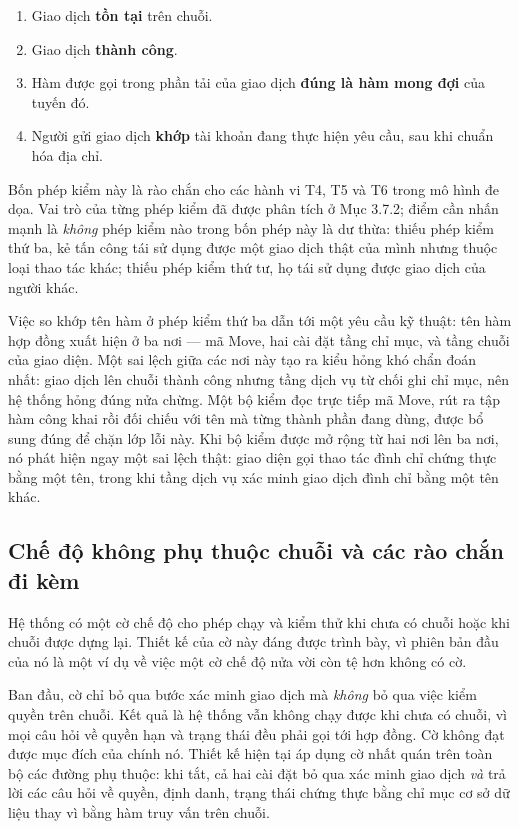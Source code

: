 \begin{enumerate}
    \item Giao dịch \textbf{tồn tại} trên chuỗi.
    \item Giao dịch \textbf{thành công}.
    \item Hàm được gọi trong phần tải của giao dịch \textbf{đúng là hàm mong đợi} của tuyến đó.
    \item Người gửi giao dịch \textbf{khớp} tài khoản đang thực hiện yêu cầu, sau khi chuẩn hóa địa chỉ.
\end{enumerate}

Bốn phép kiểm này là rào chắn cho các hành vi T4, T5 và T6 trong mô hình đe dọa. Vai trò của từng phép kiểm đã được phân tích ở Mục 3.7.2; điểm cần nhấn mạnh là \emph{không} phép kiểm nào trong bốn phép này là dư thừa: thiếu phép kiểm thứ ba, kẻ tấn công tái sử dụng được một giao dịch thật của mình nhưng thuộc loại thao tác khác; thiếu phép kiểm thứ tư, họ tái sử dụng được giao dịch của người khác.

Việc so khớp tên hàm ở phép kiểm thứ ba dẫn tới một yêu cầu kỹ thuật: tên hàm hợp đồng xuất hiện ở ba nơi --- mã Move, hai cài đặt tầng chỉ mục, và tầng chuỗi của giao diện. Một sai lệch giữa các nơi này tạo ra kiểu hỏng khó chẩn đoán nhất: giao dịch lên chuỗi thành công nhưng tầng dịch vụ từ chối ghi chỉ mục, nên hệ thống hỏng đúng nửa chừng. Một bộ kiểm đọc trực tiếp mã Move, rút ra tập hàm công khai rồi đối chiếu với tên mà từng thành phần đang dùng, được bổ sung đúng để chặn lớp lỗi này. Khi bộ kiểm được mở rộng từ hai nơi lên ba nơi, nó phát hiện ngay một sai lệch thật: giao diện gọi thao tác đình chỉ chứng thực bằng một tên, trong khi tầng dịch vụ xác minh giao dịch đình chỉ bằng một tên khác.

\subsection{Chế độ không phụ thuộc chuỗi và các rào chắn đi kèm}

Hệ thống có một cờ chế độ cho phép chạy và kiểm thử khi chưa có chuỗi hoặc khi chuỗi được dựng lại. Thiết kế của cờ này đáng được trình bày, vì phiên bản đầu của nó là một ví dụ về việc một cờ chế độ nửa vời còn tệ hơn không có cờ.

Ban đầu, cờ chỉ bỏ qua bước xác minh giao dịch mà \emph{không} bỏ qua việc kiểm quyền trên chuỗi. Kết quả là hệ thống vẫn không chạy được khi chưa có chuỗi, vì mọi câu hỏi về quyền hạn và trạng thái đều phải gọi tới hợp đồng. Cờ không đạt được mục đích của chính nó. Thiết kế hiện tại áp dụng cờ nhất quán trên toàn bộ các đường phụ thuộc: khi tắt, cả hai cài đặt bỏ qua xác minh giao dịch \emph{và} trả lời các câu hỏi về quyền, định danh, trạng thái chứng thực bằng chỉ mục cơ sở dữ liệu thay vì bằng hàm truy vấn trên chuỗi.

